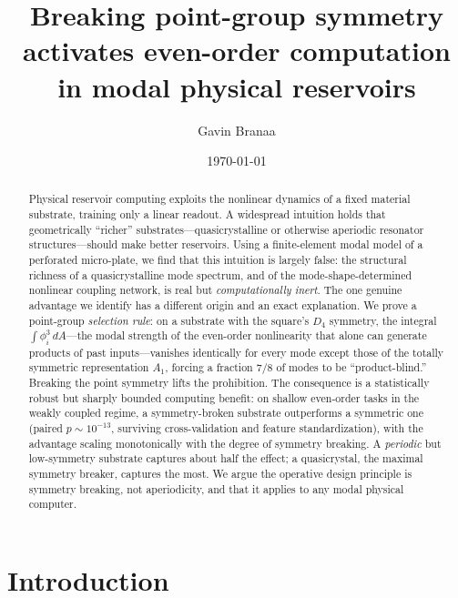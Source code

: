 \documentclass[aps,prapplied,reprint,amsmath,amssymb,floatfix]{revtex4-2}
\begin{document}
\title{Breaking point-group symmetry activates even-order computation\\
in modal physical reservoirs}

\author{Gavin Branaa}

\date{\today}

\begin{abstract}
Physical reservoir computing exploits the nonlinear dynamics of a fixed
material substrate, training only a linear readout. A widespread intuition
holds that geometrically ``richer'' substrates---quasicrystalline or otherwise
aperiodic resonator structures---should make better reservoirs. Using a
finite-element modal model of a perforated micro-plate, we find that this
intuition is largely false: the structural richness of a quasicrystalline mode
spectrum, and of the mode-shape-determined nonlinear coupling network, is real
but \emph{computationally inert}. The one genuine advantage we identify has a
different origin and an exact explanation. We prove a point-group
\emph{selection rule}: on a substrate with the square's $D_4$ symmetry, the
integral $\int \phi_i^3\,dA$---the modal strength of the even-order
nonlinearity that alone can generate products of past inputs---vanishes
identically for every mode except those of the totally symmetric representation
$A_1$, forcing a fraction $7/8$ of modes to be ``product-blind.'' Breaking the
point symmetry lifts the prohibition. The consequence is a statistically robust
but sharply bounded computing benefit: on shallow even-order tasks in the
weakly coupled regime, a symmetry-broken substrate outperforms a symmetric one
(paired $p\!\sim\!10^{-13}$, surviving cross-validation and feature
standardization), with the advantage scaling monotonically with the degree of
symmetry breaking. A \emph{periodic} but low-symmetry substrate captures about
half the effect; a quasicrystal, the maximal symmetry breaker, captures the
most. We argue the operative design principle is symmetry breaking, not
aperiodicity, and that it applies to any modal physical computer.
\end{abstract}

\maketitle

\section{Introduction}
\end{document}
